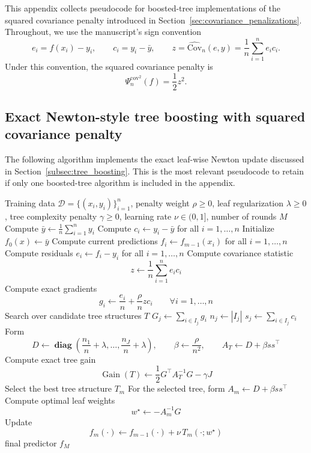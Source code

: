 \documentclass[12pt, draft]{article}
\theoremstyle{plain}
\theoremstyle{definition}
\newcommand{\1}{\mathbf{1}}
\newcommand{\Cov}{\text{Cov}}
\newcommand{\D}{\mathcal{D}}
\newcommand{\diag}{\mathbf{\operatorname{diag}}}
\begin{document}
{This appendix collects pseudocode for boosted-tree implementations of the squared covariance penalty introduced in Section~\ref{sec:covariance_penalizations}. Throughout, we use the manuscript's sign convention
\[
e_i = f(x_i)-y_i,
\qquad
c_i = y_i-\bar y,
\qquad
z = \widehat{\Cov}_n(e,y)=\frac{1}{n}\sum_{i=1}^n e_i c_i.
\]
Under this convention, the squared covariance penalty is
\[
\Psi_n^{\mathrm{cov}^2}(f)=\frac{1}{2}z^2.
\]

\subsection{Exact Newton-style tree boosting with squared covariance penalty}
\label{app:exact_newton_cov_boosting}

The following algorithm implements the exact leaf-wise Newton update discussed in Section~\ref{subsec:tree_boosting}. This is the most relevant pseudocode to retain if only one boosted-tree algorithm is included in the appendix.

\begin{algorithm}[!ht]
\caption{Exact Newton-style tree boosting with squared covariance penalty}
\label{alg:exact_newton_cov_boosting}
\begin{algorithmic}[1]
\Require Training data $\D=\{(x_i,y_i)\}_{i=1}^n$, penalty weight $\rho \ge 0$, leaf regularization $\lambda \ge 0$, tree complexity penalty $\gamma \ge 0$, learning rate $\nu \in (0,1]$, number of rounds $M$
\State Compute $\bar y \gets \frac{1}{n}\sum_{i=1}^n y_i$
\State Compute $c_i \gets y_i-\bar y$ for all $i=1,\dots,n$
\State Initialize $f_0(x) \gets \bar y$
    \State Compute current predictions $f_i \gets f_{m-1}(x_i)$ for all $i=1,\dots,n$
    \State Compute residuals $e_i \gets f_i-y_i$ for all $i=1,\dots,n$
    \State Compute covariance statistic
    \[
    z \gets \frac{1}{n}\sum_{i=1}^n e_i c_i
    \]
    \State Compute exact gradients
    \[
    g_i \gets \frac{e_i}{n} + \frac{\rho}{n} z c_i
    \qquad \forall i=1,\dots,n
    \]
    \State Search over candidate tree structures $T$
            \State $G_j \gets \sum_{i\in I_j} g_i$
            \State $n_j \gets |I_j|$
            \State $s_j \gets \sum_{i\in I_j} c_i$
        \EndFor
        \State Form
        \[
        D \gets \diag\!\left(\frac{n_1}{n}+\lambda,\dots,\frac{n_J}{n}+\lambda\right),
        \qquad
        \beta \gets \frac{\rho}{n^2},
        \qquad
        A_T \gets D + \beta ss^\top
        \]
        \State Compute exact tree gain
        \[
        \operatorname{Gain}(T)
        \gets
        \frac{1}{2}G^\top A_T^{-1}G - \gamma J
        \]
    \EndFor
    \State Select the best tree structure $T_m$
    \State For the selected tree, form $A_m \gets D + \beta ss^\top$
    \State Compute optimal leaf weights
    \[
    w^\star \gets -A_m^{-1}G
    \]
    \State Update
    \[
    f_m(\cdot) \gets f_{m-1}(\cdot) + \nu\,T_m(\cdot;w^\star)
    \]
\EndFor
\State \Return final predictor $f_M$
\end{algorithmic}
\end{algorithm}

}
\end{document}

